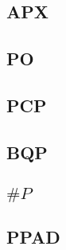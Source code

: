 \documentclass[]{article}
\theoremstyle{definition}
\begin{document}
\subsection{APX}

\subsection{PO}

\subsection{PCP}

\subsection{BQP}

\subsection{$\# P$}

\subsection{PPAD}
\end{document}
